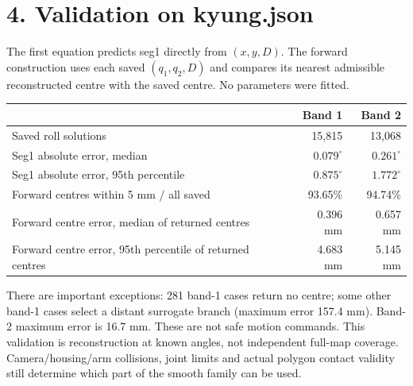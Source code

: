 \documentclass[11pt]{article}
\begin{document}
\section*{4. Validation on kyung.json}
The first equation predicts seg1 directly from $(x,y,D)$.
The forward construction uses each saved $(q_1,q_2,D)$ and compares its nearest
admissible reconstructed centre with the saved centre. No parameters were fitted.
\begin{center}
\begin{tabular}{lrr}\toprule
 & Band 1 & Band 2\\\midrule
Saved roll solutions & 15,815 & 13,068\\
Seg1 absolute error, median & $0.079^\circ$ & $0.261^\circ$\\
Seg1 absolute error, 95th percentile & $0.875^\circ$ & $1.772^\circ$\\
Forward centres within 5 mm / all saved & 93.65\% & 94.74\%\\
Forward centre error, median of returned centres & 0.396 mm & 0.657 mm\\
Forward centre error, 95th percentile of returned centres & 4.683 mm & 5.145 mm\\\bottomrule
\end{tabular}
\end{center}
There are important exceptions: 281 band-1 cases return no centre; some other
band-1 cases select a distant surrogate branch (maximum error 157.4 mm).
Band-2 maximum error is 16.7 mm. These are not safe motion commands.
This validation is reconstruction at known angles, not independent full-map
coverage. Camera/housing/arm collisions, joint limits and actual polygon contact
validity still determine which part of the smooth family can be used.
\end{document}
